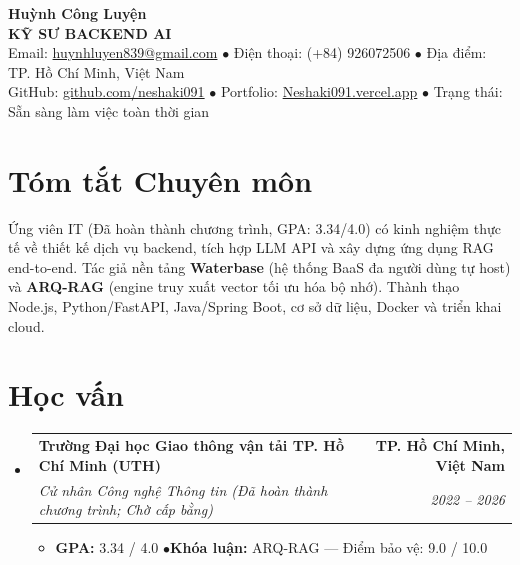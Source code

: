 \documentclass[10pt,letterpaper]{article}
\makeatletter
\newcommand{\resumeItemListStart}{\begin{itemize}[leftmargin=1.15em, label={\small$\bullet$}, itemsep=1.2pt, parsep=0pt, topsep=1.0pt, partopsep=0pt]}
\newcommand{\resumeItemListEnd}{\end{itemize}\vspace{-1pt}}
\newcommand{\resumeItem}[1]{\item \small{#1}}
\newcommand{\resumeSubheading}[4]{
  \item[]
  \begin{tabular*}{\textwidth}[t]{l@{\extracolsep{\fill}}r}
    \textbf{#1} & \textbf{\small #2} \\
    \textit{\small #3} & \textit{\small #4} \\
  \end{tabular*}\vspace{0.5pt}
}
\makeatother
\begin{document}
{\centering
  {\Large \textbf{Huỳnh Công Luyện}}\\[2pt]
  {\large \textbf{\color{secondary}KỸ SƯ BACKEND AI}} \\[3pt]
  \small{
    Email: \href{mailto:huynhluyen839@gmail.com}{huynhluyen839@gmail.com} \quad$\bullet$\quad
    Điện thoại: (+84) 926072506 \quad$\bullet$\quad
    Địa điểm: TP. Hồ Chí Minh, Việt Nam
  }\\[1.8pt]
  \small{
    GitHub: \href{https://github.com/neshaki091}{github.com/neshaki091} \quad$\bullet$\quad
    Portfolio: \href{https://Neshaki091.vercel.app}{Neshaki091.vercel.app} \quad$\bullet$\quad
    Trạng thái: Sẵn sàng làm việc toàn thời gian
  }\par
}
\vspace{2pt}

\section{Tóm tắt Chuyên môn}
\small{
Ứng viên IT (Đã hoàn thành chương trình, GPA: 3.34/4.0) có kinh nghiệm thực tế về thiết kế dịch vụ backend, tích hợp LLM API và xây dựng ứng dụng RAG end-to-end. Tác giả nền tảng \textbf{Waterbase} (hệ thống BaaS đa người dùng tự host) và \textbf{ARQ-RAG} (engine truy xuất vector tối ưu hóa bộ nhớ). Thành thạo Node.js, Python/FastAPI, Java/Spring Boot, cơ sở dữ liệu, Docker và triển khai cloud.
}

\section{Học vấn}
\begin{itemize}[leftmargin=0pt, label={}, topsep=1.0pt, partopsep=0pt, parsep=0pt]
  \resumeSubheading
    {Trường Đại học Giao thông vận tải TP. Hồ Chí Minh (UTH)}{TP. Hồ Chí Minh, Việt Nam}
    {Cử nhân Công nghệ Thông tin \textnormal{(Đã hoàn thành chương trình; Chờ cấp bằng)}}{2022 -- 2026}
    \resumeItemListStart
      \resumeItem{\textbf{GPA:} 3.34 / 4.0 \quad$\bullet$\quad \textbf{Khóa luận:} ARQ-RAG --- Điểm bảo vệ: 9.0 / 10.0}
    \resumeItemListEnd
\end{itemize}
\end{document}
